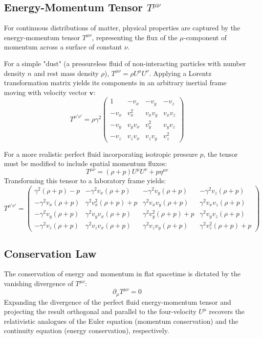 \documentclass[11pt, a4paper]{report}
\begin{document}
\subsection*{Energy-Momentum Tensor $T^{\mu\nu}$}
For continuous distributions of matter, physical properties are captured by the energy-momentum tensor $T^{\mu\nu}$, representing the flux of the $\mu$-component of momentum across a surface of constant $\nu$. 

For a simple "dust" (a pressureless fluid of non-interacting particles with number density $n$ and rest mass density $\rho$), $T^{\mu\nu} = \rho U^\mu U^\nu$. Applying a Lorentz transformation matrix yields its components in an arbitrary inertial frame moving with velocity vector $\mathbf{v}$:
\begin{equation}
T^{\mu'\nu'} = \rho \gamma^2
\begin{pmatrix}
1 & -v_x & -v_y & -v_z \\
-v_x & v_x^2 & v_x v_y & v_x v_z \\
-v_y & v_y v_x & v_y^2 & v_y v_z \\
-v_z & v_z v_x & v_z v_y & v_z^2
\end{pmatrix}
\end{equation}

For a more realistic perfect fluid incorporating isotropic pressure $p$, the tensor must be modified to include spatial momentum fluxes:
\begin{equation}
T^{\mu\nu} = (\rho+p)U^\mu U^\nu + p\eta^{\mu\nu}
\end{equation}
Transforming this tensor to a laboratory frame yields:
\begin{equation}
T^{\mu'\nu'} =
\begin{pmatrix}
\gamma^2(\rho + p) - p & -\gamma^2 v_x (\rho + p) & -\gamma^2 v_y (\rho + p) & -\gamma^2 v_z (\rho + p) \\
-\gamma^2 v_x (\rho + p) & \gamma^2 v_x^2 (\rho + p) + p & \gamma^2 v_x v_y (\rho + p) & \gamma^2 v_x v_z (\rho + p) \\
-\gamma^2 v_y (\rho + p) & \gamma^2 v_y v_x (\rho + p) & \gamma^2 v_y^2 (\rho + p) + p & \gamma^2 v_y v_z (\rho + p) \\
-\gamma^2 v_z (\rho + p) & \gamma^2 v_z v_x (\rho + p) & \gamma^2 v_z v_y (\rho + p) & \gamma^2 v_z^2 (\rho + p) + p
\end{pmatrix}
\end{equation}

\subsection*{Conservation Law}
The conservation of energy and momentum in flat spacetime is dictated by the vanishing divergence of $T^{\mu\nu}$:
\begin{equation}\label{eq:cons-T}
\partial_\mu T^{\mu\nu} = 0
\end{equation}
Expanding the divergence of the perfect fluid energy-momentum tensor and projecting the result orthogonal and parallel to the four-velocity $U^\mu$ recovers the relativistic analogues of the Euler equation (momentum conservation) and the continuity equation (energy conservation), respectively.
\end{document}
